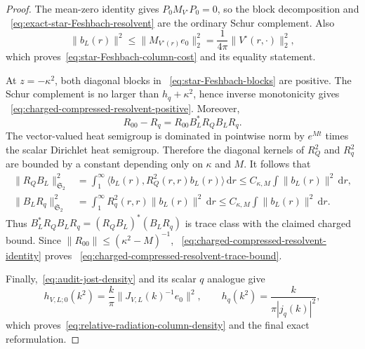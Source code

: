 \documentclass[11pt]{article}
\newcommand{\dd}{\,\mathrm d}
\theoremstyle{definition}
\theoremstyle{remark}
\begin{document}
\begin{proof}
The mean-zero identity gives
$P_0M_{V^\circ}P_0=0$, so the block decomposition and
~\eqref{eq:exact-star-Feshbach-resolvent} are the ordinary Schur complement.
Also
\begin{equation}
 \|b_L(r)\|^2\leq\|M_{V^\circ(r)}e_0\|_2^2
 =\frac1{4\pi}\|V^\circ(r,\cdot)\|_2^2,
\end{equation}
which proves~\eqref{eq:star-Feshbach-column-cost} and its equality statement.

At $z=-\kappa^2$, both diagonal blocks in
~\eqref{eq:star-Feshbach-blocks} are positive.  The Schur complement is no
larger than $h_q+\kappa^2$, hence inverse monotonicity gives
~\eqref{eq:charged-compressed-resolvent-positive}.  Moreover,
\begin{equation}
 R_{00}-R_q=R_{00}B_L^*R_QB_LR_q.
 \label{eq:charged-compressed-resolvent-identity}
\end{equation}
The vector-valued heat semigroup is dominated in pointwise norm by
$e^{Mt}$ times the scalar Dirichlet heat semigroup.  Therefore the diagonal
kernels of $R_Q^2$ and $R_q^2$ are bounded by a constant depending only on
$\kappa$ and $M$.  It follows that
\begin{align}
 \|R_QB_L\|_{\mathfrak S_2}^2
 &=\int_1^\infty
   \langle b_L(r),R_Q^2(r,r)b_L(r)\rangle\dd r
 \leq C_{\kappa,M}\int\|b_L(r)\|^2\dd r,\\
 \|B_LR_q\|_{\mathfrak S_2}^2
 &=\int_1^\infty R_q^2(r,r)\|b_L(r)\|^2\dd r
 \leq C_{\kappa,M}\int\|b_L(r)\|^2\dd r.
\end{align}
Thus
$B_L^*R_QB_LR_q=(R_QB_L)^*(B_LR_q)$ is trace class with the
claimed charged bound.  Since $\|R_{00}\|\leq(\kappa^2-M)^{-1}$,
~\eqref{eq:charged-compressed-resolvent-identity} proves
~\eqref{eq:charged-compressed-resolvent-trace-bound}.

Finally,~\eqref{eq:audit-jost-density} and its scalar $q$ analogue give
\begin{equation}
 h_{V,L;0}(k^2)=\frac{k}{\pi}\|J_{V,L}(k)^{-1}e_0\|^2,
 \qquad
 h_q(k^2)=\frac{k}{\pi|j_q(k)|^2},
\end{equation}
which proves~\eqref{eq:relative-radiation-column-density} and the final exact
reformulation.
\end{proof}
\end{document}
